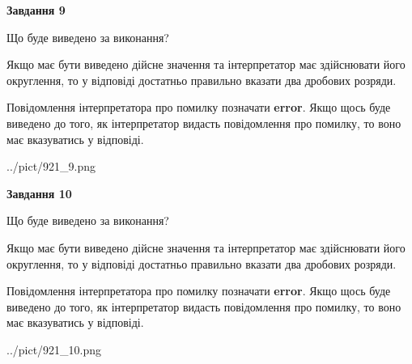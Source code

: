 \documentclass[12pt, ukrainian]{article}
\begin{document}
{\begin {Large}
{\begin {center}\textbf{Завдання 9}\end {center}}\par
Що буде виведено за виконання? \par

Якщо має бути виведено дійсне значення та інтерпретатор має здійснювати його округлення, 
то у відповіді достатньо правильно вказати два дробових розряди.

Повідомлення інтерпретатора про помилку позначати \textbf{error}.
Якщо щось буде виведено до того, як інтерпретатор видасть повідомлення про помилку, 
то воно має вказуватись у відповіді. \par

\begin{center}
	{../pict/921_9.png}
\end{center}
\newpage

{\begin {center}\textbf{Завдання 10}\end {center}}\par
Що буде виведено за виконання? \par

Якщо має бути виведено дійсне значення та інтерпретатор має здійснювати його округлення, 
то у відповіді достатньо правильно вказати два дробових розряди.

Повідомлення інтерпретатора про помилку позначати \textbf{error}.
Якщо щось буде виведено до того, як інтерпретатор видасть повідомлення про помилку, 
то воно має вказуватись у відповіді. \par

\begin{center}
	{../pict/921_10.png}
\end{center}
\newpage

\end {Large}}
\end{document}
